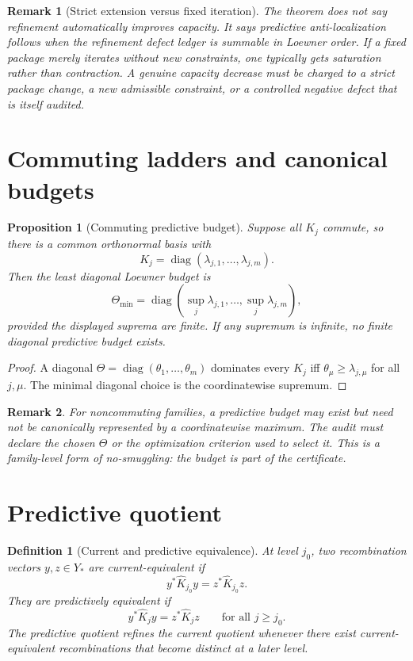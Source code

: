 \documentclass[11pt]{article}
\newtheorem{proposition}{Proposition}
\newtheorem{definition}{Definition}
\newtheorem{remark}{Remark}
\begin{document}
\begin{remark}[Strict extension versus fixed iteration]
The theorem does not say refinement automatically improves capacity. It says predictive anti-localization follows when the refinement defect ledger is summable in Loewner order. If a fixed package merely iterates without new constraints, one typically gets saturation rather than contraction. A genuine capacity decrease must be charged to a strict package change, a new admissible constraint, or a controlled negative defect that is itself audited.
\end{remark}

\section{Commuting ladders and canonical budgets}

\begin{proposition}[Commuting predictive budget]
Suppose all \(K_j\) commute, so there is a common orthonormal basis with
\[
K_j=\operatorname{diag}(\lambda_{j,1},\dots,\lambda_{j,m}).
\]
Then the least diagonal Loewner budget is
\[
\Theta_{\min}=\operatorname{diag}\left(\sup_j\lambda_{j,1},\dots,\sup_j\lambda_{j,m}\right),
\]
provided the displayed suprema are finite. If any supremum is infinite, no finite diagonal predictive budget exists.
\end{proposition}

\begin{proof}
A diagonal \(\Theta=\operatorname{diag}(\theta_1,\dots,\theta_m)\) dominates every \(K_j\) iff \(\theta_\mu\ge \lambda_{j,\mu}\) for all \(j,\mu\). The minimal diagonal choice is the coordinatewise supremum.
\end{proof}

\begin{remark}
For noncommuting families, a predictive budget may exist but need not be canonically represented by a coordinatewise maximum. The audit must declare the chosen \(\Theta\) or the optimization criterion used to select it. This is a family-level form of no-smuggling: the budget is part of the certificate.
\end{remark}

\section{Predictive quotient}

\begin{definition}[Current and predictive equivalence]
At level \(j_0\), two recombination vectors \(y,z\in Y_*\) are current-equivalent if
\[
y^*\widehat K_{j_0}y=z^*\widehat K_{j_0}z.
\]
They are predictively equivalent if
\[
y^*\widehat K_jy=z^*\widehat K_jz\qquad\text{for all }j\ge j_0.
\]
The predictive quotient refines the current quotient whenever there exist current-equivalent recombinations that become distinct at a later level.
\end{definition}
\end{document}
